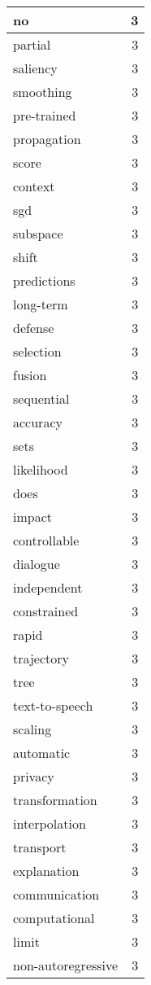 \begin{table}[h]
\begin{tabular}{|l|r|}
\hline
no & 3 \\
\hline
partial & 3 \\
\hline
saliency & 3 \\
\hline
smoothing & 3 \\
\hline
pre-trained & 3 \\
\hline
propagation & 3 \\
\hline
score & 3 \\
\hline
context & 3 \\
\hline
sgd & 3 \\
\hline
subspace & 3 \\
\hline
shift & 3 \\
\hline
predictions & 3 \\
\hline
long-term & 3 \\
\hline
defense & 3 \\
\hline
selection & 3 \\
\hline
fusion & 3 \\
\hline
sequential & 3 \\
\hline
accuracy & 3 \\
\hline
sets & 3 \\
\hline
likelihood & 3 \\
\hline
does & 3 \\
\hline
impact & 3 \\
\hline
controllable & 3 \\
\hline
dialogue & 3 \\
\hline
independent & 3 \\
\hline
constrained & 3 \\
\hline
rapid & 3 \\
\hline
trajectory & 3 \\
\hline
tree & 3 \\
\hline
text-to-speech & 3 \\
\hline
scaling & 3 \\
\hline
automatic & 3 \\
\hline
privacy & 3 \\
\hline
transformation & 3 \\
\hline
interpolation & 3 \\
\hline
transport & 3 \\
\hline
explanation & 3 \\
\hline
communication & 3 \\
\hline
computational & 3 \\
\hline
limit & 3 \\
\hline
non-autoregressive & 3 \\

\end{tabular}
\end{table}
